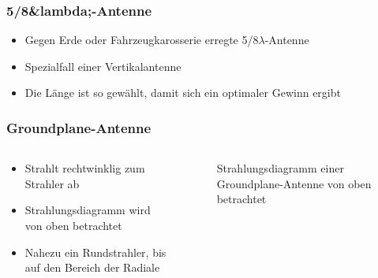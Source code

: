 \begin{frame}
\frametitle{5/8&lambda;-Antenne}
\begin{itemize}
  \item Gegen Erde oder Fahrzeugkarosserie erregte 5/8$\lambda$-Antenne
  \item Spezialfall einer Vertikalantenne
  \item Die Länge ist so gewählt, damit sich ein optimaler Gewinn ergibt
  \end{itemize}
\end{frame}

\begin{frame}
\end{frame}

\begin{frame}
\frametitle{Groundplane-Antenne}
\begin{columns}
    \begin{column}{0.48\textwidth}
    \begin{itemize}
  \item Strahlt rechtwinklig zum Strahler ab
  \item Strahlungsdiagramm wird von oben betrachtet
  \item Nahezu ein Rundstrahler, bis auf den Bereich der Radiale
  \end{itemize}

    \end{column}
   \begin{column}{0.48\textwidth}
       
\begin{figure}
    \caption{\scriptsize Strahlungsdiagramm einer Groundplane-Antenne von oben betrachtet}
    \label{e_antennenformen_strahlungsdiagramm_groundplane}
\end{figure}


   \end{column}
\end{columns}

\end{frame}

